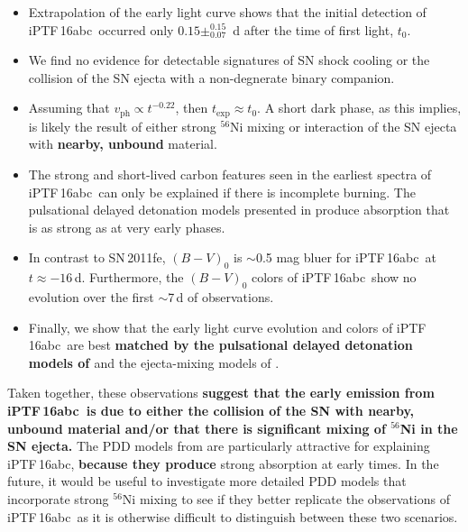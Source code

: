 \documentclass[twocolumn]{aastex61}
\newcommand{\abc}{iPTF\,16abc}
\begin{document}
\begin{itemize} 
    
    \item Extrapolation of the early light curve shows that the initial
    detection of \abc\ occurred only $0.15\pm_{0.07}^{0.15}$~d after the time
    of first light, $t_0$.

    \item We find no evidence for detectable signatures of SN shock cooling or
    the collision of the SN ejecta with a non-degnerate binary companion.

    \item Assuming that $v_\mathrm{ph} \propto t^{-0.22}$, then
    $t_\mathrm{exp} \approx t_0$. A short dark phase, as this implies, is
    likely the result of either strong $^{56}$Ni mixing or interaction of the
    SN ejecta with \textbf{nearby, unbound} material.

    \item The strong and short-lived carbon features seen in the earliest
    spectra of \abc\ can only be explained if there is incomplete burning. The
    pulsational delayed detonation models presented in
    \citet{2014MNRAS.441..532D} produce  absorption that is as
    strong as  at very early phases.

    \item In contrast to SN\,2011fe, $(B - V)_0$ is $\sim$0.5 mag bluer for
    \abc\ at $t \approx -16$\,d. Furthermore, the $(B - V)_0$ colors of \abc\
    show no evolution over the first $\sim$7\,d of observations.

    \item Finally, we show that the early light curve evolution and colors of
    \abc\ are best \textbf{matched by the pulsational delayed detonation
    models of \citet{2014MNRAS.441..532D}} and the ejecta-mixing models of
    \citet{2016ApJ...826...96P}.
 
\end{itemize}
%
Taken together, these observations \textbf{suggest that the early emission
from \abc\ is due to either the collision of the SN with nearby, unbound
material and/or that there is significant mixing of $^{56}$Ni in the SN
ejecta.} The PDD models from \citet{2014MNRAS.441..532D} are particularly
attractive for explaining \abc, \textbf{because they produce} strong
\ion{C}{2} absorption at early times. In the future, it would be useful to
investigate more detailed PDD models that incorporate strong $^{56}$Ni mixing
to see if they better replicate the observations of \abc\ as it is otherwise
difficult to distinguish between these two scenarios.
\end{document}
